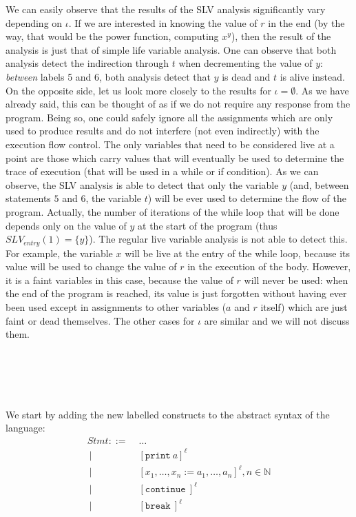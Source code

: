 \documentclass[a4wide,12pt]{article}
\def\N{\mathbb{N}}
\def\print{\texttt{print}\ }
\def\cont {\texttt{continue}\ }
\def\breakc{\texttt{break}\ }
\begin{document}
We can easily observe that the results of the SLV analysis significantly vary depending on $\iota$. 
If we are interested in knowing the value of $r$ in the end (by the way, that would be the power
function, computing $x^y$), then the result of the analysis is
just that of simple life variable analysis. One can observe that both analysis detect the indirection
through $t$ when decrementing the value of $y$: \emph{between} labels 5 and 6,
both analysis detect that $y$ is dead and $t$ is alive instead. On the opposite side, let us look
more closely to the results for $\iota = \emptyset$. As we have already said, this can be
thought of as if we do not require any response from the program. Being so, one could
safely ignore all the assignments
which are only used to 
produce results and do not interfere (not even indirectly) with the execution flow control.
The only variables that need
to be considered live at a point are those which carry values that will eventually be used
to determine the trace of execution (that will be used in a while or if condition). As we can observe,
the SLV analysis is able to detect that only the variable $y$ (and, between statements $5$ and $6$, 
the variable $t$) will be ever used to determine the flow of the program. Actually, the number of iterations of the while loop that will be done depends only on the value of $y$ at the start of the program
(thus $SLV_{entry}(1) = \{y\}$). The regular live variable analysis is not able to detect this.
For example, the variable $x$ will be live at the entry of the
while loop, because its value will be used to change the value of $r$ in the execution of the body.
However, it is a faint variables in this case, because the value of $r$ will never be used:
when the end of the program is reached, its value is just forgotten without having ever been used
except in assignments to other variables ($a$ and $r$ itself) which are just faint or dead themselves.
The other cases for $\iota$ are similar and we will not discuss them.


\section{~}
 
We start by adding the new labelled constructs to the abstract syntax of the language:
\begin{align*}
 Stmt ::= \; & \ldots \\
 ~ |\;\; & [\print a]^\ell \\
 ~ |\;\; & [x_1,\ldots,x_n := a_1,\ldots,a_n]^\ell , n \in \N \\
 ~ |\;\; & [\cont]^\ell \\
 ~ |\;\; & [\breakc]^\ell
\end{align*}
 
\end{document}
